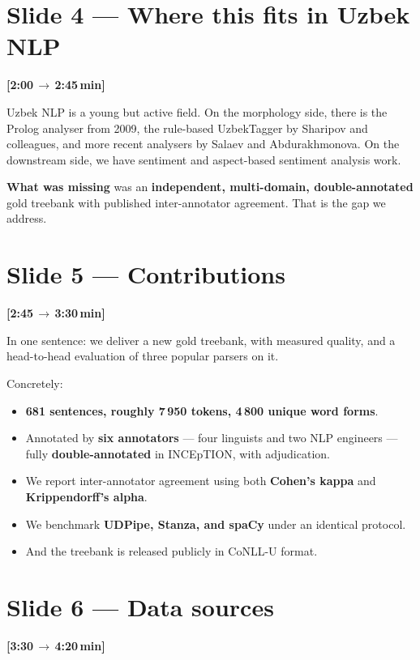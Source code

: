 \documentclass[12pt,a4paper]{article}
\newcommand{\timing}[2]{%
   \par\noindent\textbf{\small [#1\,$\to$\,#2\,min]}\par\vspace{0.2em}}
\newcommand{\say}[1]{\textbf{#1}}
\begin{document}
\section*{Slide 4 — Where this fits in Uzbek NLP}
\timing{2:00}{2:45}

Uzbek NLP is a young but active field. On the morphology side, there is
the Prolog analyser from 2009, the rule-based UzbekTagger by
Sharipov and colleagues, and more recent analysers by Salaev and
Abdurakhmonova. On the downstream side, we have sentiment and aspect-based
sentiment analysis work.

\say{What was missing} was an \say{independent, multi-domain, double-annotated}
gold treebank with published inter-annotator agreement. That is the gap we
address.

\section*{Slide 5 — Contributions}
\timing{2:45}{3:30}

In one sentence: we deliver a new gold treebank, with measured
quality, and a head-to-head evaluation of three popular parsers on it.

Concretely:

\begin{itemize}
   \item \textbf{681 sentences, roughly 7\,950 tokens, 4\,800 unique word forms}.
   \item Annotated by \textbf{six annotators} — four linguists and two NLP engineers — fully \textbf{double-annotated} in INCEpTION, with adjudication.
   \item We report inter-annotator agreement using both \textbf{Cohen's kappa} and \textbf{Krippendorff's alpha}.
   \item We benchmark \textbf{UDPipe, Stanza, and spaCy} under an identical protocol.
   \item And the treebank is released publicly in CoNLL-U format.
\end{itemize}

\section*{Slide 6 — Data sources}
\timing{3:30}{4:20}
\end{document}

